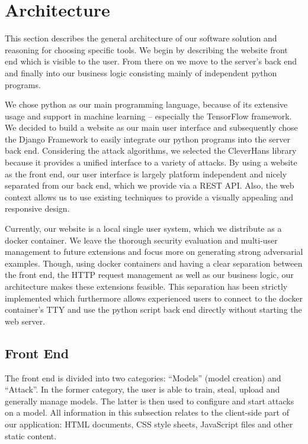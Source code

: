 
\section{Architecture}\label{sec:arch}

This section describes the general architecture of our software solution and reasoning for choosing specific tools.
We begin by describing the website front end which is visible to the user.
From there on we move to the server's back end and finally into our business logic consisting mainly of independent python programs.

We chose python as our main programming language, because of its extensive usage and support in machine learning -- especially the TensorFlow framework.
We decided to build a website as our main user interface and subsequently chose the Django Framework to easily integrate our python programs into the server back end.
Considering the attack algorithms, we selected the CleverHans library because it provides a unified interface to a variety of attacks.
By using a website as the front end, our user interface is largely platform independent and nicely separated from our back end, which we provide via a REST API.
Also, the web context allows us to use existing techniques to provide a visually appealing and responsive design.

Currently, our website is a local single user system, which we distribute as a docker container.	
We leave the thorough security evaluation and multi-user management to future extensions and focus more on generating strong adversarial examples.
Though, using docker containers and having a clear separation between the front end, the HTTP request management as well as our business logic, our architecture makes these extensions feasible.
This separation has been strictly implemented which furthermore allows experienced users to connect to the docker container's TTY and use the python script back end directly without starting the web server.

\subsection{Front End}\label{subsec:frontend}

The front end is divided into two categories: \enquote{Models} (model creation) and \enquote{Attack}.
In the former category, the user is able to train, steal, upload and generally manage models. 
The latter is then used to configure and start attacks on a model.
All information in this subsection relates to the client-side part of our application: HTML documents, CSS style sheets, JavaScript files and other static content.

